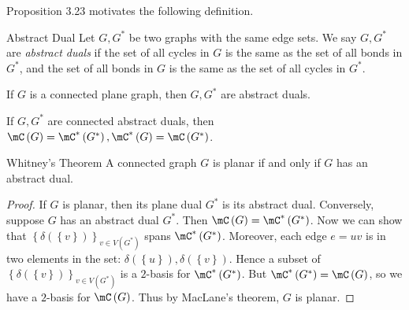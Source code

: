 \documentclass[co342]{subfiles}
\begin{document}
    \np Proposition 3.23 motivates the following definition.
    
    \begin{definition}{Abstract Dual}{}
        Let $G,G^{*}$ be two graphs with the same edge sets. We say $G,G^{*}$ are \emph{abstract duals} if the set of all cycles in $G$ is the same as the set of all bonds in $G^{*}$, and the set of all bonds in $G$ is the same as the set of all cycles in $G^{*}$.
    \end{definition}
    
    \np If $G$ is a connected plane graph, then $G,G^{*}$ are abstract duals.

    \begin{prop}{}
        If $G,G^{*}$ are connected abstract duals, then $\mC\left( G \right)=\mC^{*}\left( G^{*} \right), \mC^{*}\left( G \right)=\mC\left( G^{*} \right)$.
    \end{prop}
    
    \begin{theorem}{Whitney's Theorem}
        A connected graph $G$ is planar if and only if $G$ has an abstract dual.
    \end{theorem}
    
    \begin{proof}
        If $G$ is planar, then its plane dual $G^{*}$ is its abstract dual. Conversely, suppose $G$ has an abstract dual $G^{*}$. Then $\mC\left( G \right)=\mC^{*}\left( G^{*} \right)$. Now we can show that $\left\lbrace \delta\left( \left\lbrace v \right\rbrace \right) \right\rbrace^{}_{v\in V\left( G^{*} \right)}$ spans $\mC^{*}\left( G^{*} \right)$. Moreover, each edge $e=uv$ is in two elements in the set: $\delta\left( \left\lbrace u \right\rbrace \right),\delta\left( \left\lbrace v \right\rbrace \right)$. Hence a subset of $\left\lbrace \delta\left( \left\lbrace v \right\rbrace \right) \right\rbrace_{v\in V\left( G^{*} \right)}$ is a  $2$-basis for $\mC^{*}\left( G^{*} \right)$. But $\mC^{*}\left( G^{*} \right)=\mC\left( G \right)$, so we have a $2$-basis for $\mC\left( G \right)$. Thus by MacLane's theorem, $G$ is planar.
    \end{proof}
    
    
    
    
    
    
    
    
    
    
    
    
    
    
    
    
    
    
    
    
    
    
    
    
\end{document}

